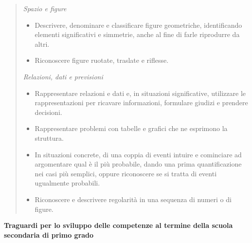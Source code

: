 \documentclass[12pt]{report}
\begin{document}
 \begin{quote}
\medskip
\textit{Spazio e figure}

\begin{itemize}
\item Descrivere, denominare e classificare figure geometriche, identificando elementi significativi e simmetrie, anche al fine di farle riprodurre da altri.

\item Riconoscere figure ruotate, traslate e riflesse.
\end{itemize}

\medskip
\textit{Relazioni, dati e previsioni}

\begin{itemize}
\item Rappresentare relazioni e dati e, in situazioni significative, utilizzare le rappresentazioni per ricavare informazioni, formulare giudizi e prendere decisioni.

\item Rappresentare problemi con tabelle e grafici che ne esprimono la struttura.

\item In situazioni concrete, di una coppia di eventi intuire e cominciare ad argomentare qual è il più probabile, dando una prima quantificazione nei casi più semplici, oppure riconoscere se si tratta di eventi ugualmente probabili.

\item Riconoscere e descrivere regolarità in una sequenza di numeri o di figure.
\end{itemize}
\end{quote}

\medskip
\noindent \textbf{Traguardi per lo sviluppo delle competenze al termine della scuola secondaria di primo grado}
\end{document}
